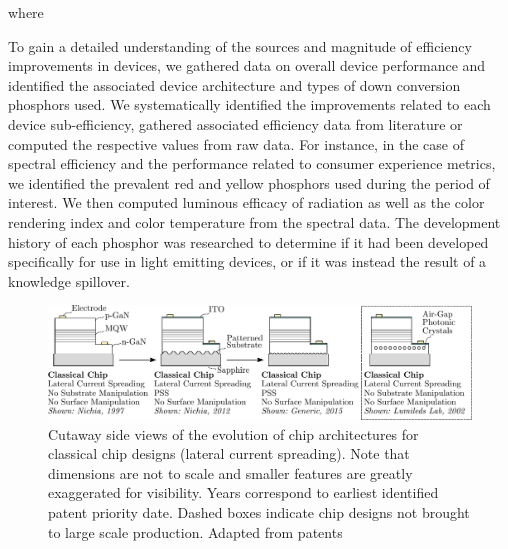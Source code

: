 \documentclass[a4paper,nocompress]{spie}  %
\begin{document}
    where 

To gain a detailed understanding of the sources and magnitude of efficiency improvements in devices, we gathered data on overall device performance and identified the associated device architecture and types of down conversion phosphors used. We systematically identified the improvements related to each device sub-efficiency, gathered associated efficiency data from literature or computed the respective values from raw data.
For instance, in the case of spectral efficiency and the performance related to consumer experience metrics, we identified the prevalent red and yellow phosphors used during the period of interest. We then computed luminous efficacy of radiation as well as the color rendering index and color temperature from the spectral data. The development history of each phosphor was researched to determine if it had been developed specifically for use in light emitting devices, or if it was instead the result of a knowledge spillover.


\begin{figure} [ht]
    \begin{center}
        \includegraphics[width=\textwidth]{SPIE/article/chip_architectures.pdf}
    \end{center}
    \caption{Cutaway side views of the evolution of chip architectures for classical chip designs (lateral current spreading). Note that dimensions are not to scale and smaller features are greatly exaggerated for visibility. Years correspond to earliest identified patent priority date. Dashed boxes indicate chip designs not brought to large scale production. Adapted from patents \cite{nagahama2013nitride,tanaka2010semiconductor,wierer2006photonic}}
    \label{fig:chip_arch}
\end{figure}
\end{document}
